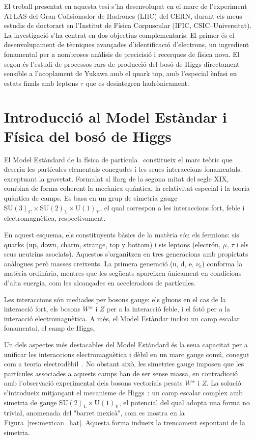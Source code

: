 El treball presentat en aquesta tesi s'ha desenvolupat en el marc de l'experiment ATLAS del Gran Colisionador de Hadrones (LHC) del CERN, durant els meus estudis de doctorart en l'Institut de Física Corpuscular (IFIC, CSIC–Universitat).
La investigació s'ha centrat en dos objectius complementaris. El primer és el desenvolupament de tècniques avançades d'identificació d'electrons, un ingredient fonamental per a nombroses anàlisis de precicisió i recerques de física nova. 
El segon és l'estudi de processos rars de producció del bosó de Higgs directament sensible a l'acoplament de Yukawa amb el quark top, amb l'especial ènfasi en estats finals amb leptons $\tau$ que es desintegren hadrònicament.

\section*{Introducció al Model Estàndar i Física del bosó de Higgs}

El Model Estàndard de la física de partícula~\cite{Glashow,Weinberg,Salam} constitueix el marc teòric que descriu les partícules elementals conegudes i les seues interaccions fonamentals. exceptuant la gravetat. 
Formulat al llarg de la segona mitat del segle XIX, combina de forma coherent la mecànica quàntica, la relativitat especial i la teoria quàntica de camps. 
Es basa en un grup de simetria gauge \(\mathrm{SU(3)_{C} \times SU(2)_{L} \times U(1)_{Y}}\), el qual correspon a les interaccions fort, feble i electromagnètica, respectivament.

En aquest esquema, els constituyents bàsics de la matèria són els fermions: sis quarks (up, down, charm, strange, top y bottom) i sis leptons (electrón, $\mu$, $\tau$ i els seus neutrins asociats). Aquestos s'organitzen en tres generacions amb propietats anàlogues però masses creixents. La primera generació (u, d, e, \(\nu_{e}\)) conforma la matèria ordinària, mentres que les següents apareixen únicament en condicions d'alta energia, com les alcançades en acceleradors de partícules. 

Les interaccions són mediades per bosons gauge: els gluons en el cas de la interacció fort, els bosons \(W^\pm\) i \(Z\) per a la interacció feble, i el fotó per a la interacció electromagnètica. A més, el Model Estàndar inclou un camp escalar fonamental, el camp de Higgs, 

Un dels aspectes més destacables del Model Estàndard és la seua capacitat per a unificar les interaccions electromagnètica i dèbil en un marc gauge comú, conegut com a teoria electrodèbil~\cite{Glashow,Weinberg,Salam}. No obstant això, les simetries gauge imposen que les partícules associades a aquests camps han de ser sense massa, en contradicció amb l’observació experimental dels bosons vectorials pesats \(W^\pm\) i \(Z\). La solució s’introdueix mitjançant el mecanisme de Higgs~\cite{Brout,HiggsSpontan}: un camp escalar complex amb simetria de gauge \(\mathrm{SU(2)_{L} \times U(1)_{Y}}\), el potencial del qual adopta una forma no trivial, anomenada del "barret mexicà", com es mostra en la Figura~\ref{res:mexican_hat}. Aquesta forma indueix la trencament espontani de la simetria.

